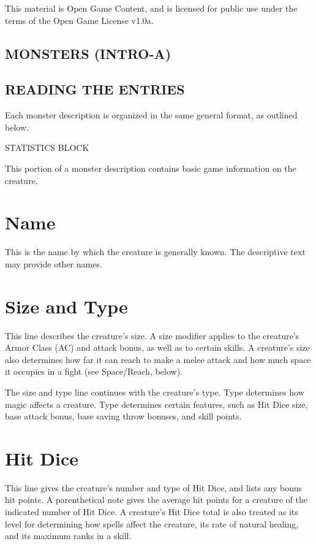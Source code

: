 \documentclass{article}
\begin{document}
This material is Open Game Content, and is licensed for public use under the terms 
of the Open Game License v1.0a.

\subsection*{{\LARGE{}MONSTERS (INTRO-A)}}

\vspace{12pt}
\subsection*{{\LARGE{}READING THE ENTRIES}}

Each monster description is organized in the same general format, as outlined below. 

\vspace{12pt}
STATISTICS BLOCK

This portion of a monster description contains basic game information on the creature.

\section*{\textbf{Name}}

This is the name by which the creature is generally known. The descriptive text 
may provide other names.

\section*{\textbf{Size and Type}}

This line describes the creature's size. A size modifier applies to the creature's 
Armor Class (AC) and attack bonus, as well as to certain skills. A creature's size 
also determines how far it can reach to make a melee attack and how much space 
it occupies in a fight (see Space/Reach, below). 

The size and type line continues with the creature's type. Type determines how 
magic affects a creature. Type determines certain features, such as Hit Dice size, 
base attack bonus, base saving throw bonuses, and skill points. 

\section*{\textbf{Hit Dice}}

This line gives the creature's number and type of Hit Dice, and lists any bonus 
hit points. A parenthetical note gives the average hit points for a creature of 
the indicated number of Hit Dice. A creature's Hit Dice total is also treated as 
its level for determining how spells affect the creature, its rate of natural healing, 
and its maximum ranks in a skill.
\end{document}
